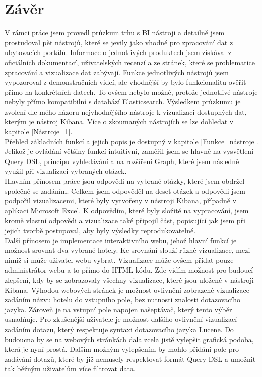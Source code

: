 \documentclass[czech,BP]{thesiskiv}
\begin{document}
\chapter{Závěr}
\label{závěr}
V rámci práce jsem provedl průzkum trhu s BI nástroji a detailně jsem prostudoval pět nástrojů, které se jevily jako vhodné pro zpracování dat z ubytovacích portálů. Informace o jednotlivých  produktech jsem získával z oficiálních dokumentací, uživatelských recenzí a ze stránek, které se problematice zpracování a vizualizace dat zabývají. Funkce jednotlivých nástrojů jsem vypozoroval z demonstračních videí, ale vhodnější by bylo funkcionalitu ověřit přímo na konkrétních datech. To ovšem nebylo možné, protože jednotlivé nástroje nebyly přímo kompatibilní s databází Elasticsearch. Výsledkem průzkumu je zvolení dle mého názoru nejvhodnějšího nástroje k vizualizaci dostupných dat, kterým je nástroj Kibana. Více o zkoumaných nástrojích se lze dohledat v kapitole \ref{Nástroje_1}.
\\
Přehled základních funkcí a jejich popis je dostupný v kapitole \ref{Funkce_nástroje}. Jelikož je ovládání většiny funkcí intuitivní, zaměřil jsem se hlavně na vysvětlení Query DSL, principu vyhledávání a na rozšíření Graph, které jsem následně využil při vizualizaci vybraných otázek.
\\
Hlavním přínosem práce jsou odpovědi na vybrané otázky, které jsem obdržel společně se zadáním. Celkem jsem odpověděl na deset otázek a odpovědi jsem podpořil vizualizacemi, které byly vytvořeny v nástroji Kibana, případně v aplikaci Microsoft Excel. K odpovědím, které byly složité na vypracování, jsem kromě vlastní odpovědi a vizualizace také připojil část, popisující jak jsem při jejich tvorbě postupoval, aby byly výsledky reprodukovatelné. 
\\
Další přínosem je implementace interaktivního webu, jehož hlavní funkcí je možnost srovnat dva vybrané hotely. Ke srovnání slouží různé vizualizace, mezi nimiž si může uživatel webu vybrat. Vizualizace může ovšem přidat pouze administrátor  webu a to přímo do HTML kódu. Zde vidím možnost pro budoucí zlepšení, kdy by se zobrazovaly všechny vizualizace, které jsou uložené v nástroji Kibana. Výhodou webových stránek je možnost ovlivnění zobrazené vizualizace zadáním názvu hotelu do vstupního pole, bez nutnosti znalosti  dotazovacího jazyka. Zároveň je na vstupní pole napojen našeptávač, který tento výběr usnadňuje. Pro  zkušenější uživatele je možnost dalšího ovlivnění vizualizací zadáním dotazu, který respektuje syntaxi dotazovacího jazyka Lucene. Do budoucna by se na webových stránkách dala zcela jistě vylepšit grafická podoba, která je nyní prostá. Dalším možným vylepšením by mohlo přidání pole pro zadávání dotazů, které by již nemusely respektovat formát Query DSL a umožnit tak běžným uživatelům více filtrovat data.
\end{document}
